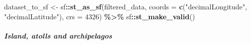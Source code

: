 \documentclass[
]{article}
\newenvironment{Shaded}{\begin{snugshade}}{\end{snugshade}}
\newcommand{\AttributeTok}[1]{\textcolor[rgb]{0.13,0.29,0.53}{#1}}
\newcommand{\DecValTok}[1]{\textcolor[rgb]{0.00,0.00,0.81}{#1}}
\newcommand{\FunctionTok}[1]{\textcolor[rgb]{0.13,0.29,0.53}{\textbf{#1}}}
\newcommand{\NormalTok}[1]{#1}
\newcommand{\OtherTok}[1]{\textcolor[rgb]{0.56,0.35,0.01}{#1}}
\newcommand{\SpecialCharTok}[1]{\textcolor[rgb]{0.81,0.36,0.00}{\textbf{#1}}}
\newcommand{\StringTok}[1]{\textcolor[rgb]{0.31,0.60,0.02}{#1}}
\begin{document}
\begin{Shaded}
\begin{Highlighting}[]
\NormalTok{dataset\_to\_sf }\OtherTok{\textless{}{-}}\NormalTok{ sf}\SpecialCharTok{::}\FunctionTok{st\_as\_sf}\NormalTok{(filtered\_data, }
                              \AttributeTok{coords =} \FunctionTok{c}\NormalTok{(}\StringTok{"decimalLongitude"}\NormalTok{, }\StringTok{"decimalLatitude"}\NormalTok{), }
                              \AttributeTok{crs =} \DecValTok{4326}\NormalTok{) }\SpecialCharTok{\%\textgreater{}\%}
\NormalTok{  sf}\SpecialCharTok{::}\FunctionTok{st\_make\_valid}\NormalTok{()}
\end{Highlighting}
\end{Shaded}

\hypertarget{island-atolls-and-archipelagos}{%
\subparagraph{Island, atolls and
archipelagos}\label{island-atolls-and-archipelagos}}
\end{document}
